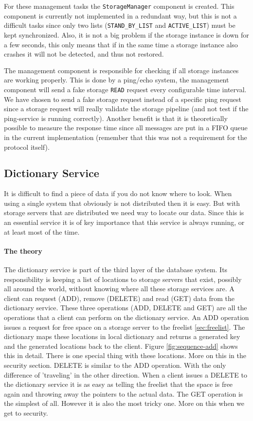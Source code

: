 \documentclass[12pt,a4paper]{scrartcl}
\begin{document}
For these management tasks the \verb|StorageManager| component is created. This component is currently not implemented in a redundant way, but this is not a difficult tasks since only two lists (\verb|STAND_BY_LIST| and \verb|ACTIVE_LIST|) must be kept synchronized. Also, it is not a big problem if the storage instance is down for a few seconds, this only means that if in the same time a storage instance also crashes it will not be detected, and thus not restored.

The management component is responsible for checking if all storage instances are working properly. This is done by a ping/echo system, the management component will send a fake storage \verb|READ| request every configurable time interval. We have chosen to send a fake storage request instead of a specific ping request since a storage request will really validate the storage pipeline (and not test if the ping-service is running correctly). Another benefit is that it is theoretically possible to measure the response time since all messages are put in a FIFO queue in the current implementation (remember that this was not a requirement for the protocol itself).

\subsection{Dictionary Service}
It is difficult to find a piece of data if you do not know where to look. When using a single system that obviously is not distributed then it is easy. But with storage servers that are distributed we need way to locate our data. Since this is an essential service it is of key importance that this service is always running, or at least most of the time. 

\paragraph{The theory}
The dictionary service is part of the third layer of the database system. Its responsibility is keeping a list of locations to storage servers that exist, possibly all around the world, without knowing where all these storage services are. A client can request (ADD), remove (DELETE) and read (GET) data from the dictionary service. These three operations (ADD, DELETE and GET) are all the operations that a client can perform on the dictionary service. An ADD operation issues a request for free space on a storage server to the freelist \ref{sec:freelist}. The dictionary maps these locations in local dictionary and returns a generated key and the generated locations back to the client. Figure \ref{fig:sequence-add} shows this in detail. There is one special thing with these locations. More on this in the security section. DELETE is similar to the ADD operation. With the only difference of 'traveling' in the other direction. When a client issues a DELETE to the dictionary service it is as easy as telling the freelist that the space is free again and throwing away the pointers to the actual data. The GET operation is the simplest of all. However it is also the most tricky one. More on this when we get to security.
\end{document}
